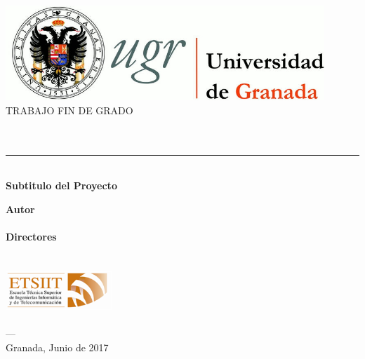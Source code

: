 \begin{titlepage}
 
 
\newlength{\centeroffset}
\setlength{\centeroffset}{-0.5\oddsidemargin}
\addtolength{\centeroffset}{0.5\evensidemargin}
\thispagestyle{empty}

\noindent\hspace*{\centeroffset}\begin{minipage}{\textwidth}

\centering
\includegraphics[width=0.9\textwidth]{imagenes/logo_ugr.jpg}\\[1.4cm]

\textsc{ \Large TRABAJO FIN DE GRADO\\[0.2cm]}
\textsc{ \myDegree}\\[1cm]
% 
{\Huge\bfseries \myTitle \\
}
\noindent\rule[-1ex]{\textwidth}{3pt}\\[3.5ex]
{\large\bfseries Subtitulo del Proyecto}
\end{minipage}

\vspace{2.5cm}
\noindent\hspace*{\centeroffset}\begin{minipage}{\textwidth}
\centering

\textbf{Autor}\\ {\myName}\\
\textbf{Directores}\\
{\myProf \\
\myOtherProf}\\[2cm]
\includegraphics[width=0.3\textwidth]{imagenes/etsiit_logo.png}\\[0.1cm]
\textsc{\myFaculty}\\
\textsc{---}\\
Granada, Junio de 2017
\end{minipage}
\end{titlepage}



